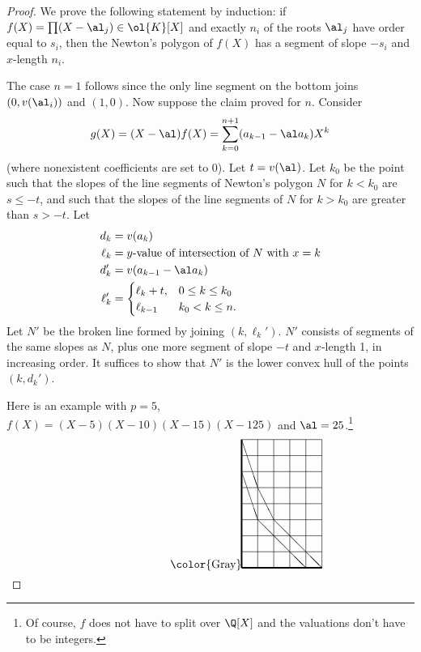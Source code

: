 \begin{proof}
We prove the following statement by induction: if $f(X)=\prod (X-\al_j)\in \ol{K}[X]$ and exactly $n_i$ of the roots $\al_j$ have order equal to $s_i$, then the Newton's polygon of $f(X)$ has a segment of slope $-s_i$ and $x$-length $n_i$.

The case $n=1$ follows since the only line segment on the bottom joins $(0, v(\al_i))$ and $(1,0)$. Now suppose the claim proved for $n$. Consider
\[
g(X)=(X-\al)f(X)=\sum_{k=0}^{n+1} (a_{k-1}-\al a_{k})X^k
\]
(where nonexistent coefficients are set to 0). 
Let $t=v(\al)$. 
Let $k_0$ be the point such that the slopes of the line segments of Newton's polygon $N$ for $k<k_0$ are $s\le -t$, and such that the slopes of the line segments of $N$ for $k>k_0$ are greater than $s>-t$. Let
\begin{align*}
d_k&=v(a_k)\\
\ell_k&=\text{$y$-value of intersection of $N$ with $x=k$}\\
d_k'&=v(a_{k-1}-\al a_{k})\\
\ell_k'&=\begin{cases}
\ell_k+t,&0\le k\le k_0\\
\ell_{k-1}&k_0<k\le n.
\end{cases}
\end{align*}
Let $N'$ be the broken line formed by joining $(k,\ell_k')$. $N'$ consists of segments of the same slopes as $N$, plus one more segment of slope $-t$ and $x$-length 1, in increasing order. It suffices to show that $N'$ is the lower convex hull of the points $(k,d_k')$.

Here is an example with $p=5$, $f(X)=(X-5)(X-10)(X-15)(X-125)$ and $\al=25$.\footnote{Of course, $f$ does not have to split over $\Q[X]$ and the valuations don't have to be integers.}
\[
\setlength{\unitlength}{.5cm}
\begin{picture}(5,8)
\linethickness{0.5mm}
{\color{Gray}
\put(0,0){\line(1,0){5}}
\put(0,0){\line(0,1){8}}
\linethickness{0.15mm}
\multiput(1,0)(1,0){5}{\line(0,1){8}}
\multiput(0,1)(0,1){8}{\line(1,0){5}}}
\put(0,6){\line(1,-3){1}}
\put(1,3){\line(1,-1){3}}
\put(0,8){\line(1,-3){1}}
\put(1,5){\line(1,-2){1}}
\put(2,3){\line(1,-1){3}}
\end{picture}
\]


\end{proof}
